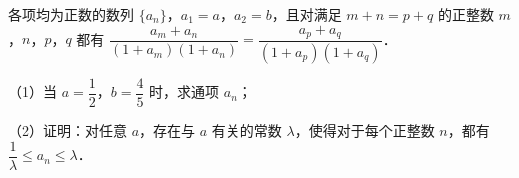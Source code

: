 \endgroup
\begin{question}
各项均为正数的数列 $\{a_n\}$，$a_1=a$，$a_2=b$，且对满足 $m+n=p+q$ 的正整数 $m$，$n$，$p$，$q$ 都有 $\dfrac{a_m+a_n}{(1+a_m)(1+a_n)}=\dfrac{a_p+a_q}{(1+a_p)(1+a_q)}$．

（1）当 $a=\dfrac12$，$b=\dfrac45$ 时，求通项 $a_n$；

（2）证明：对任意 $a$，存在与 $a$ 有关的常数 $\lambda$，使得对于每个正整数 $n$，都有 $\dfrac1\lambda\leqslant a_n\leqslant\lambda$．

\end{question}